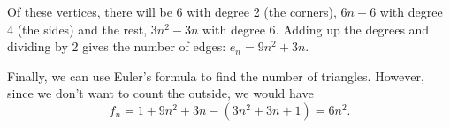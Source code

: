 \documentclass[10pt]{exam}
\begin{document}
\begin{questions}
\begin{solution}
  Of these vertices, there will be 6 with degree 2 (the corners), $6n-6$ with degree 4 (the sides) and the rest, $3n^2 - 3n$ with degree 6.  Adding up the degrees and dividing by 2 gives the number of edges: $e_n = 9n^2 + 3n$.

  Finally, we can use Euler's formula to find the number of triangles.  However, since we don't want to count the outside, we would have
  \[f_n = 1 + 9n^2 + 3n - (3n^2 + 3n + 1) = 6n^2.\]
\end{solution}














\end{questions}
\end{document}
